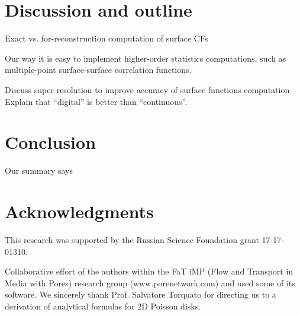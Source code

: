 \documentclass[reprint,amsmath,amssymb,aps,pre]{revtex4-1}
\begin{document}
\section{Discussion and outline}
Exact vs. for-reconstruction computation of surface CFs

Our way it is easy to implement higher-order statistics computations, such as
multiple-point surface-surface correlation functions.

Discuss super-resolution to improve accuracy of surface functions computation
Explain that ``digital'' is better than ``continuous''.

\section{Conclusion}
Our summary says

\section{Acknowledgments}
This research was supported by the Russian Science Foundation grant
17-17-01310.

Collaborative effort of the authors within the FaT iMP (Flow and Transport in
Media with Pores) research group (www.porenetwork.com) and used some of its
software. We sincerely thank Prof. Salvatore Torquato for directing us to a
derivation of analytical formulas for 2D Poisson disks.

\appendix
\end{document}
